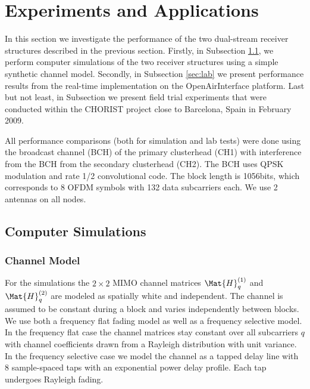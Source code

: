 \documentclass[a4paper,twocolumn,journal]{IEEEtran}
\begin{document}
\section{Experiments and Applications}
\label{sec:exp}

In this section we investigate the performance of the two dual-stream receiver structures described in the previous section. Firstly, in Subsection \ref{sec:sim}, we perform computer simulations of the two receiver structures using a simple synthetic channel model. Secondly, in Subsection \ref{sec:lab} we present performance results from the real-time implementation on the OpenAirInterface platform. Last but not least, in Subsection \label{sec:trials}
we present field trial experiments that were conducted within the CHORIST project close to Barcelona, Spain in February 2009. 

All performance comparisons (both for simulation and lab tests) were done using the broadcast channel (BCH) of the primary clusterhead (CH1) with interference from the BCH from the secondary clusterhead (CH2). The BCH uses QPSK modulation and rate 1/2 convolutional code. The block length is 1056bits, which corresponds to 8 OFDM symbols with 132 data subcarriers each. We use 2 antennas on all nodes.

\subsection{Computer Simulations}
\label{sec:sim}

\subsubsection{Channel Model}



For the simulations the $2 \times 2$ MIMO channel matrices $\Mat{H}_q^{(1)}$ and $\Mat{H}_q^{(2)}$ are modeled as spatially white and independent. The channel is assumed to be constant during a block and varies independently between blocks. We use both a frequency flat fading model as well as a frequency selective model. In the frequency flat case the channel matrices stay constant over all subcarriers $q$ with channel coefficients drawn  from a Rayleigh distribution with unit variance. In the frequency selective case we model the channel as a tapped delay line with 8 sample-spaced taps with an exponential power delay profile. Each tap undergoes Rayleigh fading. 


\end{document}
